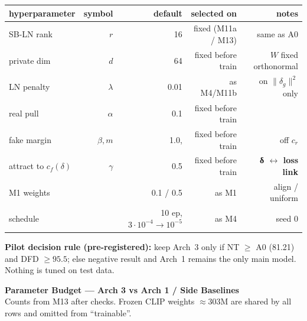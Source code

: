 \documentclass[11pt]{article}
\begin{document}
\vspace{3mm}
\begin{center}
\small
\begin{tabular}{lrrrr}
\toprule
hyperparameter & symbol & default & selected on & notes \\
\midrule
SB-LN rank & \(r\) & 16 & fixed (M11a / M13) & same as A0 \\
private dim & \(d\) & 64 & fixed before train & \(W\) fixed orthonormal \\
LN penalty & \(\lambda\) & 0.01 & as M4/M11b & on \(\|\delta_g\|^2\) only \\
real pull & \(\alpha\) & 0.1 & fixed before train & \\
fake margin & \(\beta,m\) & 1.0,\;0.1 & fixed before train & off \(c_r\) \\
attract to \(c_f(\delta)\) & \(\gamma\) & 0.5 & fixed before train & \textbf{δ \(\leftrightarrow\) loss link} \\
M1 weights & & 0.1 / 0.5 & as M1 & align / uniform \\
schedule & & 10 ep, \(3{\cdot}10^{-4}{\to}10^{-5}\) & as M4 & seed 0 \\
\bottomrule
\end{tabular}
\end{center}

\vfill
{\small\textbf{Pilot decision rule (pre-registered):} keep Arch~3 only if NT \(\ge\) A0 (81.21) and DFD \(\ge95.5\); else negative result and Arch~1 remains the only main model. Nothing is tuned on test data.}

\newpage
\begin{center}
{\Large\bfseries Parameter Budget --- Arch 3 vs Arch 1 / Side Baselines}\\[2pt]
{\small Counts from M13 after checks. Frozen CLIP weights \(\approx303\)M are shared by all rows and omitted from ``trainable''.}
\end{center}
\vspace{6mm}
\end{document}
